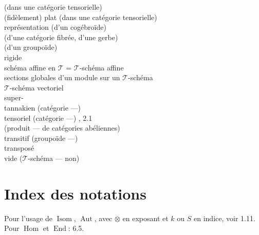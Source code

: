 \documentclass[12pt,a4paper]{article}
\theoremstyle{plain}
\theoremstyle{definition}
\DeclareMathOperator{\Hom}{Hom}
\DeclareMathOperator{\End}{End}
\DeclareMathOperator{\Aut}{Aut}
\DeclareMathOperator{\Isom}{Isom}
\begin{document}
\begin{tabbing}
\> (dans une catégorie tensorielle)  \\
(fidèlement) plat (dans une catégorie tensorielle) \>  \\
représentation (d'un cogébroïde) \>  \\
\> (d'une catégorie fibrée, d'une gerbe)  \\
\> (d'un groupoïde)  \\
rigide \>  \\
schéma affine en $\mathcal{T}$ = $\mathcal{T}$-schéma affine \>  \\[4pt]
sections globales d'un module sur un $\mathcal{T}$-schéma \>  \\
$\mathcal{T}$-schéma vectoriel \>  \\
super- \>  \\
tannakien (catégorie ---) \>  \\
tensoriel (catégorie ---) \> , 2.1 \\
\> (produit --- de catégories abéliennes)  \\
transitif (groupoïde ---) \>  \\
transposé \>  \\
vide ($\mathcal{T}$-schéma --- non) \> 
\end{tabbing}

\section*{Index des notations}

Pour l'usage de $\Isom$, $\Aut$, avec $\otimes$ en exposant et $k$ ou $S$ en indice, voir 1.11. Pour $\Hom$ et $\End$: 6.5.
\end{document}
